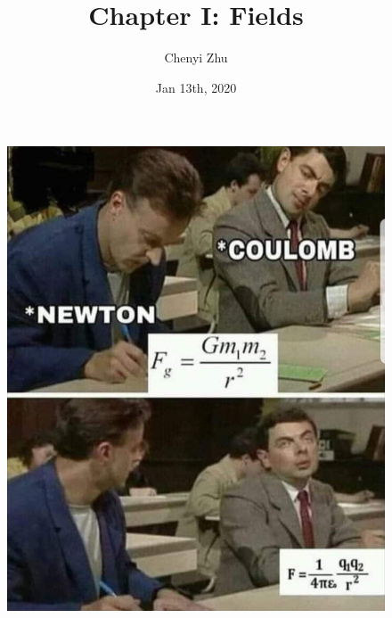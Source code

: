 \documentclass[11pt, letterpaper]{article}
\title{Chapter I: Fields}
\author{Chenyi Zhu}
\date{Jan 13th, 2020}
\begin{document}
\begin{titlingpage}

		\maketitle
			
			\begin{figure}[h!]
				\centering
				\includegraphics[scale=0.2]{coulomb.jpg}
				\label{fig:coulomb-meme}
			\end{figure}
			
		
\end{titlingpage}
\end{document}
